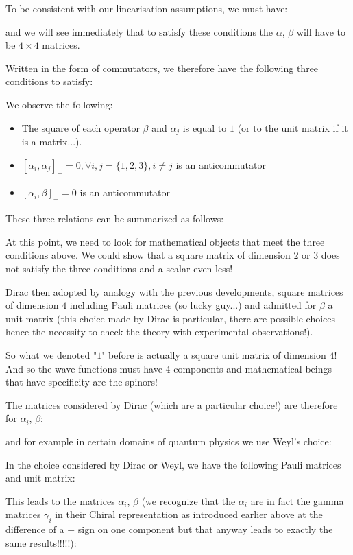 	To be consistent with our linearisation assumptions, we must have:
	
	and we will see immediately that to satisfy these conditions the $\alpha$, $\beta$ will have to be $4\times 4$ matrices.

	Written in the form of commutators, we therefore have the following three conditions to satisfy:
	
	We observe the following:
	\begin{itemize}
		\item The square of each operator $\beta$ and $\alpha_j$ is equal to $1$ (or to the unit matrix if it is a matrix...).

		\item $\left[\alpha_i,\alpha_j\right]_{+}=0,\forall i,j=\{1,2,3\},i\neq j$ is an anticommutator

		\item $\left[\alpha_i,\beta\right]_{+}=0$ is an anticommutator
	\end{itemize}
	These three relations can be summarized as follows:
	
	At this point, we need to look for mathematical objects that meet the three conditions above. We could show that a square matrix of dimension $2$ or $3$ does not satisfy the three conditions and a scalar even less!

	Dirac then adopted by analogy with the previous developments, square matrices of dimension $4$ including Pauli matrices (so lucky guy...) and admitted for $\beta$ a unit matrix (this choice made by Dirac is particular, there are possible choices hence the necessity to check the theory with experimental observations!).

	So what we denoted "$1$" before is actually a square unit matrix of dimension $4$! And so the wave functions must have $4$ components and mathematical beings that have specificity are the spinors!

	The matrices considered by Dirac (which are a particular choice!) are therefore for $\alpha_i$, $\beta$:
	
	and for example in certain domains of quantum physics we use Weyl's choice:
	
	In the choice considered by Dirac or Weyl, we have the following Pauli matrices and unit matrix:
	
	This leads to the matrices $\alpha_i$, $\beta$ (we recognize that the $\alpha_i$ are in fact the gamma matrices $\gamma_i$ in their Chiral representation as introduced earlier above at the difference of a $-$ sign on one component but that anyway leads to exactly the same results!!!!!):
	
